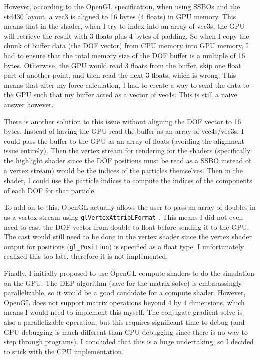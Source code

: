 \documentclass[letterpaper, 10 pt, conference]{ieeeconf}  %
\begin{document}
        However, according to the OpenGL specification, when using SSBOs and the std430 layout, a vec3 is aligned to 16 bytes (4 floats) in GPU memory. This means that in the shader, when I try to index into an array of vec3s, the GPU will retrieve the result with 3 floats plus 4 bytes of padding. So when I copy the chunk of buffer data (the DOF vector) from CPU memory into GPU memory, I had to ensure that the total memory size of the DOF buffer is a multiple of 16 bytes. Otherwise, the GPU would read 3 floats from the buffer, skip one float part of another point, and then read the next 3 floats, which is wrong. This means that after my force calculation, I had to create a way to send the data to the GPU such that my buffer acted as a vector of vec4s. This is still a naive answer however. 

        There is another solution to this issue without aligning the DOF vector to 16 bytes. Instead of having the GPU read the buffer as an array of vec4s/vec3s, I could pass the buffer to the GPU as an array of floats (avoiding the alignment issue entirely). Then the vertex stream for rendering for the shaders (specifically the highlight shader since the DOF positions must be read as a SSBO instead of a vertex stream) would be the indices of the particles themselves. Then in the shader, I could use the particle indices to compute the indices of the components of each DOF for that particle. 

        To add on to this, OpenGL actually allows the user to pass an array of doubles in as a vertex stream using \texttt{glVertexAttribLFormat} \cite{opengl_documentation} . This means I did not even need to cast the DOF vector from double to float before sending it to the GPU. The cast would still need to be done in the vertex shader since the vertex shader output for positions (\texttt{gl\_Position}) is specified as a float type. I unfortunately realized this too late, therefore it is not implemented. 

        Finally, I initially proposed to use OpenGL compute shaders to do the simulation on the GPU. The DEP algorithm (save for the matrix solve) is embarassingly parallelizable, so it would be a good candidate for a compute shader. However, OpenGL does not support matrix operations beyond 4 by 4 dimensions, which means I would need to implement this myself. The conjugate gradient solve is also a parallelizable operation, but this requires significant time to debug (and GPU debugging is much different than CPU debugging since there is no way to step through programs). I concluded that this is a huge undertaking, so I decided to stick with the CPU implementation.
\end{document}
